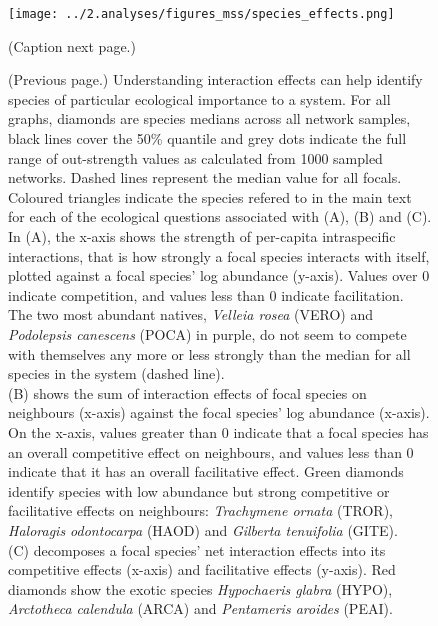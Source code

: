 \documentclass[a4,12pt]{article}
\begin{document}


    \begin{figure}[H]
        \begin{centering}
        \texttt{[image: ../2.analyses/figures\_mss/species\_effects.png]}
        \caption{(Caption next page.)}
        \label{fig:species}
        \end{centering}
    \end{figure} 

    \addtocounter{figure}{-1}
	\begin{figure} [t!]
  		\caption{(Previous page.) Understanding interaction effects can help identify species of particular ecological importance to a system. For all graphs, diamonds are species medians across all network samples, black lines cover the 50\% quantile and grey dots indicate the full range of out-strength values as calculated from 1000 sampled networks. Dashed lines represent the median value for all focals. Coloured triangles indicate the species refered to in the main text for each of the ecological questions associated with (A), (B) and (C). \\
        In (A), the x-axis shows the strength of per-capita intraspecific interactions, that is how strongly a focal species interacts with itself, plotted against a focal species' log abundance (y-axis). Values over $0$ indicate competition, and values less than $0$ indicate facilitation.  The two most abundant natives, \textit{Velleia rosea} (VERO) and \textit{Podolepsis canescens} (POCA) in purple, do not seem to compete with themselves any more or less strongly than the median for all species in the system (dashed line). \\
        (B) shows the sum of interaction effects of focal species on neighbours (x-axis) against the focal species' log abundance (x-axis). On the x-axis, values greater than $0$ indicate that a focal species has an overall competitive effect on neighbours, and values less than $0$ indicate that it has an overall facilitative effect. Green diamonds identify species with low abundance but strong competitive or facilitative effects on neighbours: \textit{Trachymene ornata} (TROR), \textit{Haloragis odontocarpa} (HAOD) and \textit{Gilberta tenuifolia} (GITE). \\
        (C) decomposes a focal species' net interaction effects into its competitive effects (x-axis) and facilitative effects (y-axis). Red diamonds show the exotic species \textit{Hypochaeris glabra} (HYPO), \textit{Arctotheca calendula} (ARCA) and \textit{Pentameris aroides} (PEAI).} 
	\end{figure}
\end{document}
